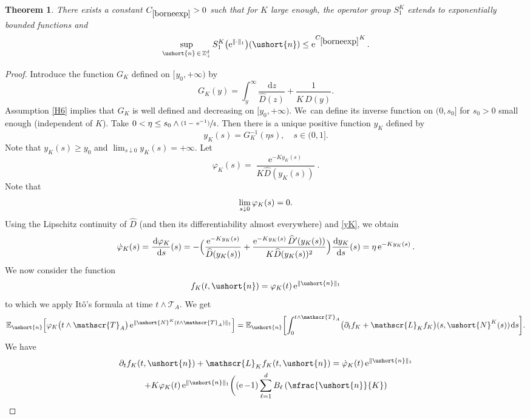 \documentclass[10pt]{amsart}
\newcommand{\psfrac}[2]{\sfrac{(#1)}{#2}}
\let\mathcal\mathscr
\numberwithin{equation}{section}
\theoremstyle{plain}
\newtheorem{theorem}{Theorem}[section]
\theoremstyle{definition}
\newcommand{\cte}[1]{C_{\eqref{#1}}}
\newcommand{\E}{{\mathbb{E}}}
\newcommand{\zentiers}{{\mathbb{Z}}}
\newcommand{\sdomaine}{{\zentiers}_+^d}
\newcommand{\sK}{K}
\newcommand{\gen}{\mathscr{L}_{\sK}}
\newcommand{\vecn}{\ushort{n}}
\newcommand{\leproc}{\ushort{N}^{K}}
\newcommand{\sleproc}{\ushort{N}^{K}}
\newcommand{\e}{\operatorname{e}}
\newcommand{\dd}{\hspace{1pt}\mathrm{d}}
\begin{document}
\begin{theorem}\label{borneexp}
There exists a constant $\cte{borneexp}>0$ such that for $K$ large enough, the operator
group $S^{\sK}_{1}$ extends to exponentially bounded functions and
\[
\sup_{\vecn\, \in\, \sdomaine} S^{\sK}_{1}\bigl(\e^{\|\hspace{-0.1pt}\cdot\|_{1}}\bigr)(\vecn)\le
\e^{\cte{borneexp} K}.
\]
\end{theorem}
\begin{proof}
Introduce the function $G_{\sK}$ defined on $[\hspace{1pt}y_{0},+\infty)$ by
\[
G_{\!\sK}(y) = \int_{y}^{\infty}\frac{\dd z}{\widehat{D}(z)}+\frac{1}{K\,\widehat{D}(y)}.
\]
Assumption \eqref{H6} implies that $G_{\!\sK}$ is well defined and decreasing on $[y_{0},+\infty)$. We~can define its
inverse function on $(0,s_{0}]$ for $s_{0}>0$ small enough (independent of $K$).
Take $0<\eta \leq s_{0}\wedge \psfrac{1-\,\e^{-1}}{4}$. Then there is a unique positive function $y_{\sK}$ defined by
\begin{equation}
\label{yK}
y_{\sK}(s)=G_{\!\sK}^{-1}(\eta s),\quad s\in(0,1].
\end{equation}
Note that $y_{\sK}(s)\geq y_{0}$ and $\lim_{s\downarrow 0}y_{\sK}(s)=+\infty$.
Let
\[
\varphi_{\sK}(s)=\frac{\e^{-K y_{K}(s)}}{K \widehat{D}(y_{\sK}(s))}.
\]
Note that
\[
\lim_{s\hspace{.2pt}\downarrow\hspace{.2pt}0}\varphi_{\sK}(s)=0.
\]
Using the Lipschitz continuity of $\widehat{D}$ (and then its differentiability almost everywhere) and \eqref{yK}, we obtain
\[
\dot{\varphi}_{\sK}(s)=\frac{\dd\varphi_{\sK}}{\dd s}(s)=
-\Bigl(\frac{\e^{-K y_{K}(s)}}{\widehat{D}(y_{\sK}(s))}+
\frac{\e^{-K y_{K}(s)} \widehat{D}'(y_{\sK}(s))}{K \widehat{D}(y_{\sK}(s))^{2}}\Bigr)\frac{\dd y_{\sK}}{\dd s}(s)
= \eta \e^{-K y_{K}(s)}.
\]
We now consider the function
\[
f_{\sK}(t,\vecn)=\varphi_{\sK}(t)\e^{\|\vecn\|_{1}}
\]
to which we apply Itô's formula at time $t\wedge \mathcal{T}_A$. We get
\[
\E_{\vecn}\Bigl[\varphi_{\sK}\bigl(t\wedge \mathcal{T}_A\bigr)\e^{\|\sleproc(t\wedge \mathcal{T}_A)\|_{1}}\Bigr]=
\E_{\vecn} \biggl[\int_{0}^{t\wedge \mathcal{T}_A}\bigl(\partial_{t}f_{\sK}+\gen f_{\sK}\bigr)(s,\leproc(s))\dd s \biggr].
\]
We have
\begin{multline*}
\partial_{t}f_{\sK}(t,\vecn)+\gen f_{\sK}(t,\vecn)=
\dot\varphi_{\sK}(t)\e^{\|\vecn\|_{1}}\\
+K \varphi_{\sK}(t)\e^{\|\vecn\|_{1}}\biggl((\e-1)\sum_{\ell=1}^{d}B_{\ell}\left(\sfrac{\vecn}{K}\right)

\end{multline*}
\end{proof}
\end{document}
